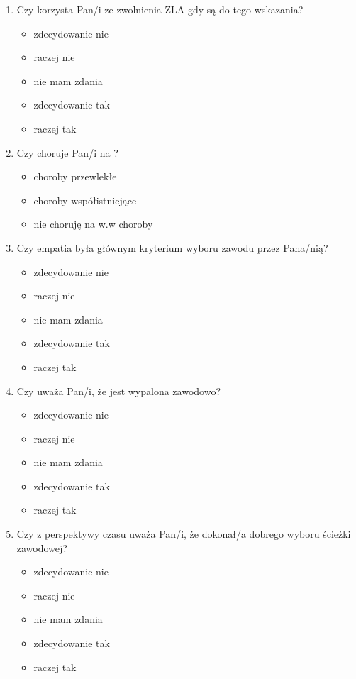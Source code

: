 \documentclass[a4paper,12pt,twoside,openright]{mwrep}
\begin{document}
\begin{enumerate}[label=\arabic*)]
			\item{ Czy korzysta Pan/i ze zwolnienia ZLA gdy są do tego wskazania?}
		\begin{itemize}
			\item{zdecydowanie nie}
			\item{raczej nie}
			\item{nie mam zdania}
			\item{zdecydowanie tak}
			\item{raczej tak}
		\end{itemize}
		\vspace{\baselineskip}
		
			\item{Czy choruje Pan/i  na ?}
		\begin{itemize}
			\item{choroby przewlekłe}
			\item{choroby współistniejące}
			\item{nie choruję na w.w choroby}
			\end{itemize}
		\vspace{\baselineskip}
		
			\item{Czy empatia była głównym kryterium wyboru zawodu przez Pana/nią?}
		\begin{itemize}
			\item{zdecydowanie nie}
			\item{raczej nie}
			\item{nie mam zdania}
			\item{zdecydowanie tak}
			\item{raczej tak}
		\end{itemize}
		\vspace{\baselineskip}
		
			\item{Czy uważa Pan/i, że jest wypalona zawodowo?}
		\begin{itemize}
			\item{zdecydowanie nie}
			\item{raczej nie}
			\item{nie mam zdania}
			\item{zdecydowanie tak}
			\item{raczej tak}
		\end{itemize}
		\vspace{\baselineskip}
		
			\item{ Czy z perspektywy czasu uważa Pan/i, że dokonał/a dobrego wyboru ścieżki zawodowej?}
		\begin{itemize}
			\item{zdecydowanie nie}
			\item{raczej nie}
			\item{nie mam zdania}
			\item{zdecydowanie tak}
			\item{raczej tak}
		\end{itemize}
		\vspace{\baselineskip}
		

\end{enumerate}
\end{document}
